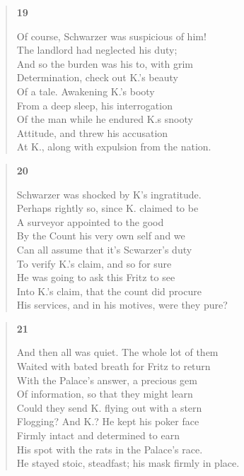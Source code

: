 \documentclass{article}
\begin{document}
\begin{verse}
  \begin{center}
    \textbf{19} \\
  \end{center}
  Of course, Schwarzer was suspicious of him! \\
  The landlord had neglected his duty; \\
  And so the burden was his to, with grim \\
  Determination, check out K.'s beauty \\
  Of a tale. Awakening K.'s booty \\
  From a deep sleep, his interrogation \\
  Of the man while he endured K.s snooty \\
  Attitude, and threw his accusation \\
  At K., along with expulsion from the nation.

\end{verse}

\newpage

\begin{verse}
  \begin{center}
    \textbf{20} \\
  \end{center}
  Schwarzer was shocked by K's ingratitude. \\
  Perhaps rightly so, since K. claimed to be \\
  A surveyor appointed to the good \\
  By the Count his very own self and we \\
  Can all assume that it's Scwarzer's duty \\
  To verify K.'s claim, and so for sure \\
  He was going to ask this Fritz to see \\
  Into K.'s claim, that the count did procure \\
  His services, and in his motives, were they pure?
\end{verse}

\begin{verse}
  \begin{center}
    \textbf{21} \\
  \end{center}
  And then all was quiet. The whole lot of them \\
  Waited with bated breath for Fritz to return \\
  With the Palace's answer, a precious gem \\
  Of information, so that they might learn \\
  Could they send K. flying out with a stern \\
  Flogging? And K.? He kept his poker face \\
  Firmly intact and determined to earn \\
  His spot with the rats in the Palace's race. \\
  He stayed stoic, steadfast; his mask firmly in place.
\end{verse}
\end{document}
